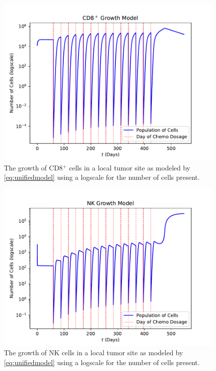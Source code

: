 \documentclass[11pt]{amsart}
\begin{document}
\begin{figure}[h!]
\begin{center} %
\includegraphics[scale=0.6]{./images/CD8_growth.pdf} %
\end{center}
\caption{The growth of CD8$^+$  cells in a local tumor site as modeled by \eqref{eq:unifiedmodel} using a logscale for the number of cells present.}
\label{fig:CD8growth} %
\end{figure}


\begin{figure}[h!]
\begin{center} %
\includegraphics[scale=0.6]{./images/NK_growth.pdf} %
\end{center}
\caption{The growth of NK cells in a local tumor site as modeled by \eqref{eq:unifiedmodel} using a logscale for the number of cells present.}
\label{fig:NKgrowth} %
\end{figure}
\end{document}
